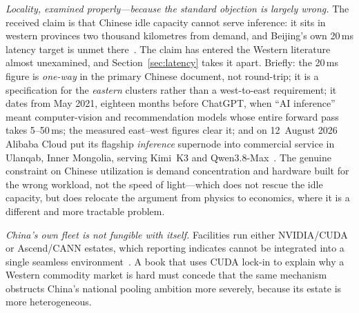 \emph{Locality, examined properly---because the standard objection is largely wrong.} The received claim is that Chinese idle capacity cannot serve inference: it sits in western provinces two thousand kilometres from demand, and Beijing's own 20\,ms latency target is unmet there~\cite{china-idle,toms-latency}. The claim has entered the Western literature almost unexamined, and Section~\ref{sec:latency} takes it apart. Briefly: the 20\,ms figure is \emph{one-way} in the primary Chinese document, not round-trip; it is a specification for the \emph{eastern} clusters rather than a west-to-east requirement; it dates from May 2021, eighteen months before ChatGPT, when ``AI inference'' meant computer-vision and recommendation models whose entire forward pass takes 5--50\,ms; the measured east--west figures clear it; and on 12~August 2026 Alibaba Cloud put its flagship \emph{inference} supernode into commercial service in Ulanqab, Inner Mongolia, serving Kimi~K3 and Qwen3.8-Max~\cite{m890-ulanqab}. The genuine constraint on Chinese utilization is demand concentration and hardware built for the wrong workload, not the speed of light---which does not rescue the idle capacity, but does relocate the argument from physics to economics, where it is a different and more tractable problem.

\emph{China's own fleet is not fungible with itself.} Facilities run either NVIDIA/CUDA or Ascend/CANN estates, which reporting indicates cannot be integrated into a single seamless environment~\cite{china-idle}. A book that uses CUDA lock-in to explain why a Western commodity market is hard must concede that the same mechanism obstructs China's national pooling ambition more severely, because its estate is more heterogeneous.

